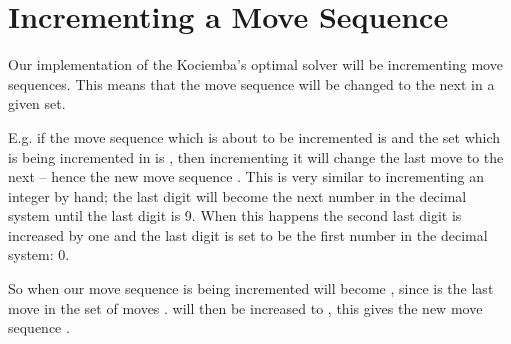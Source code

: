 \section{Incrementing a Move Sequence}
\label{sec:incMoveSequence}
Our implementation of the Kociemba's optimal solver will be incrementing move sequences.
This means that the move sequence will be changed to the next in a given set.

E.g. if the move sequence which is about to be incremented is  and the set which is being incremented in is , then incrementing it will change the last move  to the next  -- hence the new move sequence .
This is very similar to incrementing an integer by hand; the last digit will become the next number in the decimal system until the last digit is 9. When this happens the second last digit is increased by one and the last digit is set to be the first number in the decimal system: 0.

So when our move sequence  is being incremented  will become , since  is the last move in the set of moves .  will then be increased to , this gives the new move sequence .